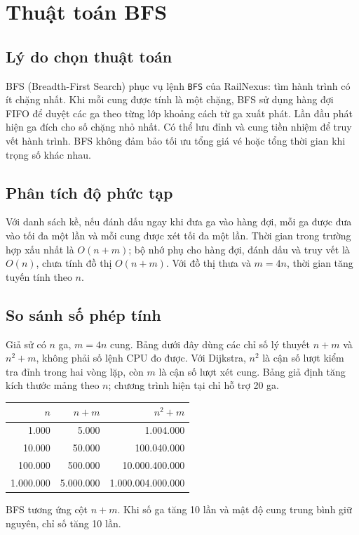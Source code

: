 \chapter{Thuật toán BFS}
\section{Lý do chọn thuật toán}
BFS (Breadth-First Search) phục vụ lệnh \texttt{BFS} của RailNexus: tìm hành trình có ít chặng nhất. Khi mỗi cung được tính là một chặng, BFS sử dụng hàng đợi FIFO để duyệt các ga theo từng lớp khoảng cách từ ga xuất phát. Lần đầu phát hiện ga đích cho số chặng nhỏ nhất. Có thể lưu đỉnh và cung tiền nhiệm để truy vết hành trình. BFS không đảm bảo tối ưu tổng giá vé hoặc tổng thời gian khi trọng số khác nhau.
\section{Phân tích độ phức tạp}
Với danh sách kề, nếu đánh dấu ngay khi đưa ga vào hàng đợi, mỗi ga được đưa vào tối đa một lần và mỗi cung được xét tối đa một lần. Thời gian trong trường hợp xấu nhất là $O(n+m)$; bộ nhớ phụ cho hàng đợi, đánh dấu và truy vết là $O(n)$, chưa tính đồ thị $O(n+m)$. Với đồ thị thưa và $m=4n$, thời gian tăng tuyến tính theo $n$.
\section{So sánh số phép tính}
Giả sử có $n$ ga, $m=4n$ cung. Bảng dưới đây dùng các chỉ số lý thuyết $n+m$ và $n^2+m$, không phải số lệnh CPU đo được. Với Dijkstra, $n^2$ là cận số lượt kiểm tra đỉnh trong hai vòng lặp, còn $m$ là cận số lượt xét cung. Bảng giả định tăng kích thước mảng theo $n$; chương trình hiện tại chỉ hỗ trợ 20 ga.
\begin{center}
\begin{tabular}{r|r|r}
$n$ & $n+m$ & $n^2+m$ \\\hline
1.000 & 5.000 & 1.004.000 \\
10.000 & 50.000 & 100.040.000 \\
100.000 & 500.000 & 10.000.400.000 \\
1.000.000 & 5.000.000 & 1.000.004.000.000 \\
\end{tabular}
\end{center}
BFS tương ứng cột $n+m$. Khi số ga tăng 10 lần và mật độ cung trung bình giữ nguyên, chỉ số tăng 10 lần.
